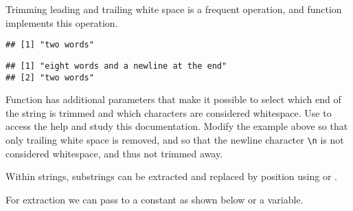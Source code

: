 \documentclass[krantz2]{krantz}\usepackage{knitr}
\begin{document}
Trimming leading and trailing white space is a frequent operation, and \Rlang function  implements this operation.

\begin{knitrout}\footnotesize
{}\color{fgcolor}\begin{kframe}
\begin{alltt}
\hlstd{(} \hlstd{=} \hlstd{)}
\end{alltt}
\begin{verbatim}
## [1] "two words"
\end{verbatim}
\begin{alltt}
\hlstd{(} \hlstd{=} \hlstd{(}\hlstd{,} \hlstd{))}
\end{alltt}
\begin{verbatim}
## [1] "eight words and a newline at the end"
## [2] "two words"
\end{verbatim}
\end{kframe}
\end{knitrout}

\begin{playground}
Function  has additional parameters that make it possible to select which end of the string is trimmed and which characters are considered whitespace. Use  to access the help and study this documentation. Modify the example above so that only trailing white space is removed, and so that the newline character \verb!\n! is not considered whitespace, and thus not trimmed away.
\end{playground}

Within  strings, substrings can be extracted and replaced by position using  or .

For extraction we can pass to  a constant as shown below or a variable.
\end{document}
